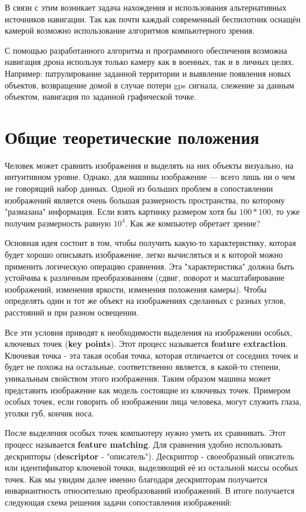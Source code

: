В связи с этим возникает задача нахождения и использования альтернативных источников навигации. Так как почти каждый современный беспилотник оснащён камерой возможно использование алгоритмов компьютерного зрения.

С помощью разработанного алгоритма и программного обеспечения возможна навигация дрона используя только камеру как в военных, так и в личных целях. Например: патрулирование заданной территории и выявление появления новых объектов, возвращение домой в случае потери gps сигнала, слежение за данным объектом, навигация по заданной графической точке.

\section{Общие теоретические положения}   

Человек может сравнить изображения и выделять на них объекты визуально, на интуитивном уровне. Однако, для машины изображение — всего лишь ни о чем не говорящий набор данных. Одной из больших проблем в сопоставлении изображений является очень большая размерность пространства, по которому "размазана" информация. Если взять картинку размером хотя бы $100*100$, то уже получим размерность равную $10^4$. Как же компьютер обретает зрение?

Основная идея состоит в том, чтобы получить какую-то характеристику, которая будет хорошо описывать изображение, легко вычисляться и к которой можно применить логическую операцию сравнения. Эта "характеристика" должна быть устойчива к различным преобразованиям (сдвиг, поворот и масштабирование изображений, изменения яркости, изменения положения камеры). Чтобы определять один и тот же объект на изображениях сделанных с разных углов, расстояний и при разном освещении.

Все эти условия приводят к необходимости выделения на изображении особых, ключевых точек (\textbf{key points}). Этот процесс называется \textbf{feature extraction}. Ключевая точка - эта такая особая точка, которая отличается от соседних точек и будет не похожа на остальные, соответственно является, в какой-то степени, уникальным свойством этого изображения. Таким образом машина может представить изображение как модель состоящие из ключевых точек. Примером особых точек, если говорить об изображении лица человека, могут служить глаза, уголки губ, кончик носа. 

После выделения особых точек компьютеру нужно уметь их сравнивать. Этот процесс называется \textbf{feature matching}. Для сравнения удобно использовать дескрипторы (\textbf{descriptor} - "описатель"). Дескриптор - своеобразный описатель или идентификатор ключевой точки, выделяющий её из остальной массы особых точек. Как мы увидим далее именно благодаря дескрипторам получается инвариантность относительно преобразований изображений. 
В итоге получается следующая схема решения задачи сопоставления изображений:

